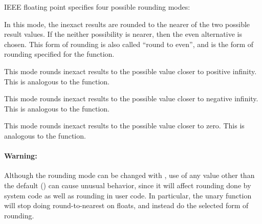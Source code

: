 IEEE floating point specifies four possible rounding modes:
\begin{Lentry}
  
\item[\kwd{nearest}] In this mode, the inexact results are rounded to
  the nearer of the two possible result values.  If the neither
  possibility is nearer, then the even alternative is chosen.  This
  form of rounding is also called ``round to even'', and is the form
  of rounding specified for the \clisp{}  function.
  
\item[\kwd{positive-infinity}] This mode rounds inexact results to the
  possible value closer to positive infinity.  This is analogous to
  the \clisp{}  function.
  
\item[\kwd{negative-infinity}] This mode rounds inexact results to the
  possible value closer to negative infinity.  This is analogous to
  the \clisp{}  function.
  
\item[\kwd{zero}] This mode rounds inexact results to the possible
  value closer to zero.  This is analogous to the \clisp{}
   function.
\end{Lentry}

\paragraph{Warning:}

Although the rounding mode can be changed with
, use of any value other than the
default () can cause unusual behavior, since it will
affect rounding done by \llisp{} system code as well as rounding in
user code.  In particular, the unary  function will stop
doing round-to-nearest on floats, and instead do the selected form of
rounding.

